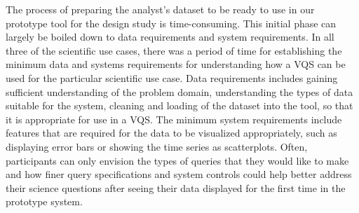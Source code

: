 { 
\par The process of preparing the analyst's dataset to be ready to use in our prototype tool for the design study is time-consuming. %
This initial phase can largely be boiled down to data requirements and system requirements. In all three of the scientific use cases, there was a period of time for establishing the minimum data and systems requirements for understanding how a VQS can be used for the particular scientific use case. Data requirements includes gaining sufficient understanding of the problem domain, understanding the types of data suitable for the system, cleaning and loading of the dataset into the tool, so that it is appropriate for use in a VQS. The minimum system requirements include features that are required for the data to be visualized appropriately, such as displaying error bars or showing the time series as scatterplots. Often, participants can only envision the types of queries that they would like to make and how finer query specifications and system controls could help better address their science questions after seeing their data displayed for the first time in the prototype system.

}

